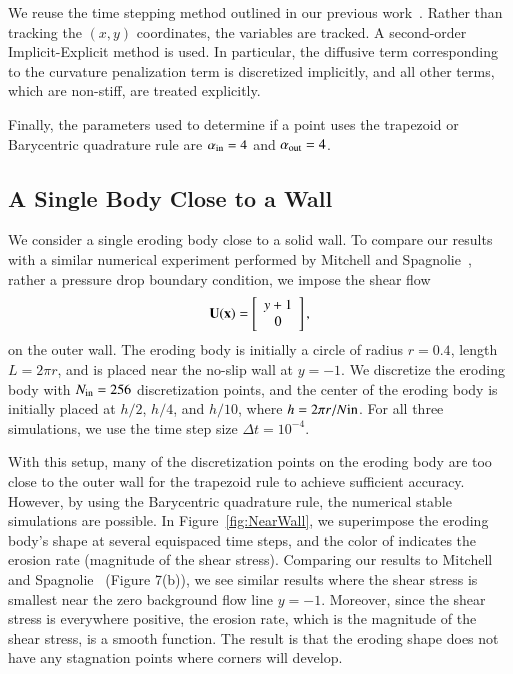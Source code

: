 \documentclass[preprint, 10pt]{elsarticle}
\begin{document}
We reuse the time stepping method outlined in our previous
work~\cite{qua-moo2018}.  Rather than tracking the $(x,y)$
coordinates, the {\thL} variables are tracked. A second-order
Implicit-Explicit method is used. In particular, the diffusive term
corresponding to the curvature penalization term is discretized
implicitly, and all other terms, which are non-stiff, are treated
explicitly.

Finally, the parameters used to determine if a point uses the trapezoid
or Barycentric quadrature rule are $\alpha_{\mathrm{in}} = 4$ and
$\alpha_{\mathrm{out}}=4$.

\subsection{A Single Body Close to a Wall}
We consider a single eroding body close to a solid wall.  To compare our
results with a similar numerical experiment performed by Mitchell and
Spagnolie~\cite{mit-spa2017}, rather a pressure drop boundary condition,
we impose the shear flow
\begin{align}
  {\mathbf{U}}({\mathbf{x}})=\left[
  \begin{array}{c}
    y+1 \\ 0
  \end{array}
  \right],
\end{align}
on the outer wall.  The eroding body is initially a circle of
radius $r=0.4$, length $L = 2\pi r$, and is placed near the no-slip wall
at $y=-1$.  We discretize the eroding body with $N_{\mathrm{in}}=256$
discretization points, and the center of the eroding body is initially
placed at $h/2$, $h/4$, and $h/10$, where $h = 2\pi r/N\mathrm{in}$.  For all
three simulations, we use the time step size $\Delta t=10^{-4}$.

With this setup, many of the discretization points on the eroding body
are too close to the outer wall for the trapezoid rule to achieve
sufficient accuracy.  However, by using the Barycentric quadrature rule,
the numerical stable simulations are possible.  In
Figure~\ref{fig:NearWall}, we superimpose the eroding body's shape at
several equispaced time steps, and the color of indicates the erosion
rate (magnitude of the shear stress).  Comparing our results to Mitchell
and Spagnolie~\cite{mit-spa2017} (Figure 7(b)), we see similar results
where the shear stress is smallest near the zero background flow line
$y=-1$.  Moreover, since the shear stress is everywhere positive, the
erosion rate, which is the magnitude of the shear stress, is a smooth
function.  The result is that the eroding shape does not have any
stagnation points where corners will develop.
\end{document}
